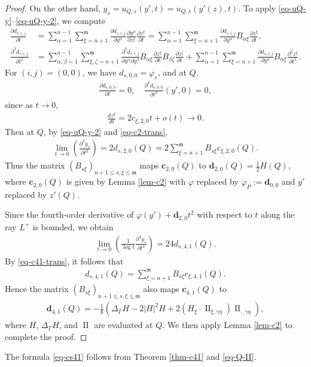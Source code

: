\documentclass[11pt,reqno]{amsart}
\newcommand{\fm}{\mathfrak{m}}
\renewcommand{\leq}{\leqslant}
\theoremstyle{definition}
\numberwithin{equation}{section}
\begin{document}
\begin{proof}
On the other hand, $y_s = u_{Q, s}(y', t) = u_{Q, s}(y'(z), t)$. To apply \eqref{eq-uQ-y}--\eqref{eq-uQ-y-2}, we compute
\begin{align}
    \frac{\partial d_{s, i,j}}{\partial t} &= \sum_{\alpha=1}^{n-1}\sum_{\xi =n+1}^\fm \frac{\partial d_{s, i,j}}{\partial y^\alpha} \frac{\partial y^\alpha}{\partial z^\xi} \frac{\partial z^\xi}{\partial t} = \sum_{\alpha=1}^{n-1}\sum_{\xi =n+1}^\fm \frac{\partial d_{s, i,j}}{\partial y^\alpha} B_{\alpha\xi} \frac{\partial z^\xi}{\partial t}, \\
    \frac{\partial^2 d_{s, i,j}}{\partial t^2} &= \sum_{\alpha,\beta=1}^{n-1}\sum_{\xi,\zeta =n+1}^\fm \frac{\partial^2 d_{s, i,j}}{\partial y^\alpha \partial y^\beta} B_{\alpha\xi} \frac{\partial z^\xi}{\partial t} B_{\beta\zeta} \frac{\partial z^\zeta}{\partial t}+\sum_{\alpha=1}^{n-1}\sum_{\xi =n+1}^\fm \frac{\partial d_{s, i,j}}{\partial y^\alpha} B_{\alpha\xi} \frac{\partial^2 z^\xi}{\partial t^2}.
\end{align}
For $(i,j)=(0,0)$, we have $d_{s,0,0}=\varphi_s$, and at $Q$,
\begin{align}
    \frac{\partial d_{s, 0,0}}{\partial t}=0, \quad \frac{\partial^2 d_{s, 0,0}}{\partial t^2} (y', 0)=0,
\end{align}
since as $t\rightarrow 0$,
\begin{align}
    \frac{d z^\xi}{d t} = 2c_{\xi, 2, 0} t+o(t) \rightarrow 0.
\end{align}
Then at $Q$, by \eqref{eq-uQ-y-2} and \eqref{eq-c2-trans},
\begin{align}
   \lim_{t\rightarrow 0}\left(\frac{\partial^2 y_s}{\partial t^2} \right) = 2 d_{s, 2, 0}(Q)=2 \sum_{\xi=n+1}^\fm B_{s\xi} c_{\xi,2,0}(Q).
\end{align}
Thus the matrix $(B_{s\xi})_{n+1\leq s, \xi\leq \fm}$ maps $\mathbf c_{2,0}(Q)$ to $\mathbf d_{2,0}(Q) = \frac{1}{2}H(Q)$, where $\mathbf c_{2,0}(Q)$ is given by Lemma \ref{lem-c2} with $\varphi$ replaced by $\varphi_P := \mathbf d_{0,0}$ and $y'$ replaced by $z'(Q)$.

Since the fourth-order derivative of $\varphi(y')+ \mathbf d_{2, 0} t^2$ with respect to $t$ along the ray $L^+$ is bounded, we obtain
\begin{align}
    \lim_{t\rightarrow 0}\left(\frac{1}{\log t} \frac{\partial^4 y_s}{\partial t^4} \right) = 24 d_{s,4,1}(Q).
\end{align}
By \eqref{eq-c41-trans}, it follows that
\begin{align}
    d_{s,4,1}(Q) = \sum_{\xi=n+1}^\fm B_{s\xi} c_{\xi,4,1}(Q).
\end{align}
Hence the matrix $(B_{s\xi})_{n+1\leq s, \xi\leq \fm}$ also maps $\mathbf c_{4,1}(Q)$ to
\begin{align}
\mathbf d_{4,1}(Q) =  -\frac{1}{8} \left( \Delta_\Gamma H-2|H|^2 H + 2(H_{\xi} \cdot \operatorname{II}_{\xi,\gamma\eta}) \operatorname{II}_{\cdot,\gamma\eta}\right),
\end{align}
where $H$, $\Delta_\Gamma H$, and $\operatorname{II}$ are evaluated at $Q$. We then apply Lemma \ref{lem-c2}  to complete the proof.
\end{proof}
The formula
\eqref{eq-cs41} follows from Theorem \ref{thm-c41} and  \eqref{eq-Q-II}.
\end{document}
